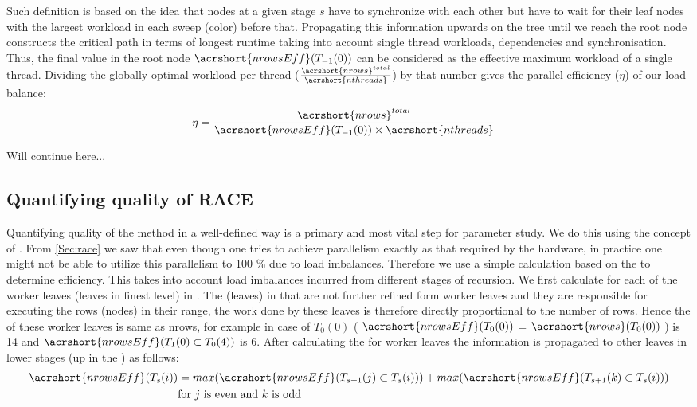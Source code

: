 Such definition is based on the idea that nodes at a given stage $s$ have to synchronize with each other but have to wait for their leaf nodes with the largest workload in each sweep (color) before that. Propagating this information upwards on the tree until we reach the root node constructs the critical path in terms of longest runtime taking into account single thread workloads, dependencies and synchronisation. Thus, the final value in the root node $\acrshort{nrowsEff}(T_{-1}(0))$ can be considered as the effective maximum workload of a single thread. Dividing the globally optimal workload per thread ($\frac{\acrshort{nrows}^{total}}{\acrshort{nthreads}}$) by that number gives the parallel efficiency ($\eta$) of our load balance: 
\begin{align*}
	\eta &= \frac{ \acrshort{nrows}^{total}} {\acrshort{nrowsEff}(T_{-1}(0)) \times \acrshort{nthreads}} 
\end{align*}

{\GW Will continue here...}

\subsection{Quantifying quality of \acrshort{RACE}}
Quantifying quality of the method in a well-defined way is a primary and most vital step for parameter study. We do this using the concept of \effPar. From \cref{Sec:race} we saw that even though one tries to achieve parallelism exactly as that required by the hardware, in practice one might not be able to utilize this parallelism to 100 \% due to load imbalances. Therefore we use a simple calculation based on the \levelTree to determine efficiency. This takes into account load imbalances incurred from different stages of recursion. We first calculate \effRow for each of the worker leaves (leaves in finest level) in \levelTree.
The \levelGroups (leaves) in \levelTree that are not further refined form worker leaves and they are responsible for executing the rows (nodes) in their range, the work done by these leaves is therefore directly proportional to the number of rows. Hence the \effRow of these worker leaves is same as \acrfull{nrows}, for example in case of $T_0(0)$ \effRow ( $\acrshort{nrowsEff}(T_0(0))$ = $\acrshort{nrows}(T_0(0))$ ) is 14 and $\acrshort{nrowsEff}(T_1(0) \subset T_0(4))$ is 6. After calculating the \effRow for worker leaves the information is propagated to other leaves in lower stages (up in the \levelTree) as follows: 
\begin{align*}
\acrshort{nrowsEff}(T_s(i)) &= max(\acrshort{nrowsEff}(T_{s+1}(j) \subset T_s(i))) + max(\acrshort{nrowsEff}(T_{s+1}(k) \subset T_s(i)))\\
 & \text{for } j \text{ is even and } k \text{ is odd}
\end{align*}

